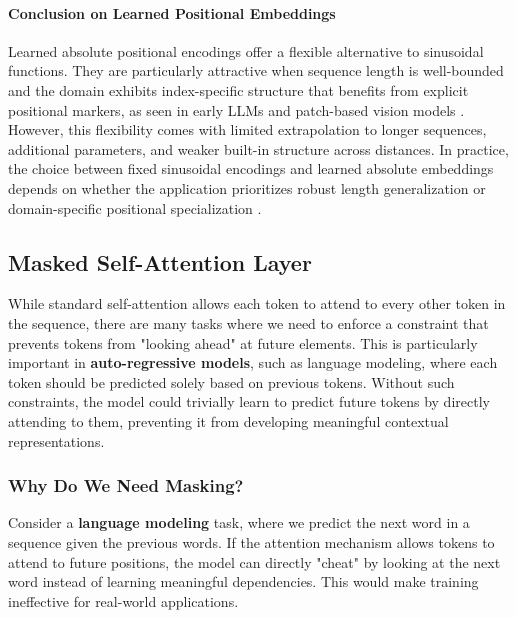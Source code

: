 \paragraph{Conclusion on Learned Positional Embeddings}
\noindent
Learned absolute positional encodings offer a flexible alternative to sinusoidal functions.
They are particularly attractive when sequence length is well-bounded and the domain exhibits index-specific structure that benefits from explicit positional markers,
as seen in early LLMs and patch-based vision models \cite{devlin2019_bert,radford2019_language,vit2020_transformers}.
However, this flexibility comes with limited extrapolation to longer sequences, additional parameters, and weaker built-in structure across distances.
In practice, the choice between fixed sinusoidal encodings and learned absolute embeddings depends on whether the application prioritizes robust length generalization or domain-specific positional specialization \cite{kazemnejad2019_pencoding}.

\newpage

\subsection{Masked Self-Attention Layer}
\label{sec:chapter17_masked_self_attention}

\noindent While standard self-attention allows each token to attend to every other token in the sequence, there are many tasks where we need to enforce a constraint that prevents tokens from "looking ahead" at future elements. This is particularly important in \textbf{auto-regressive models}, such as language modeling, where each token should be predicted solely based on previous tokens. Without such constraints, the model could trivially learn to predict future tokens by directly attending to them, preventing it from developing meaningful contextual representations.

\subsubsection{Why Do We Need Masking?}

\noindent Consider a \textbf{language modeling} task, where we predict the next word in a sequence given the previous words. If the attention mechanism allows tokens to attend to future positions, the model can directly "cheat" by looking at the next word instead of learning meaningful dependencies. This would make training ineffective for real-world applications.


